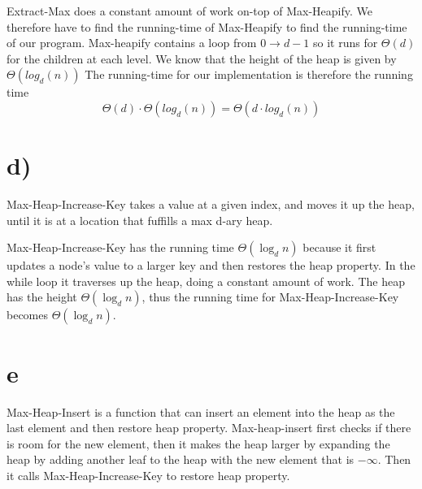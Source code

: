 \documentclass{article}
\begin{document}
Extract-Max does a constant amount of work on-top of Max-Heapify.
We therefore have to find the running-time of Max-Heapify to find the running-time of our program.
Max-heapify contains a loop from $0 \rightarrow d-1$ so it runs for $\Theta(d)$ for the children at each level.
We know that the height of the heap is given by $\Theta{(log_d{(n)})}$
The running-time for our implementation is therefore the running time
$$\Theta(d) \cdot \Theta{(log_d{(n)})} = \Theta{(d\cdot log_d{(n)})}$$


\section*{d)}
Max-Heap-Increase-Key takes a value at a given index, and moves it up the heap, until it is at a location that fuffills a max d-ary heap.

\begin{center}
	\begin{minipage}{12cm}
		\begin{algorithmic}
			\EndIf{}

			\EndWhile{}

			\EndProcedure{}
		\end{algorithmic}
	\end{minipage}
\end{center}

Max-Heap-Increase-Key has the running time $\Theta(\log_d{n})$ because it first updates a node's value to a larger key and then restores the heap property.
In the while loop it traverses up the heap, doing a constant amount of work.
The heap has the height $\Theta{(\log_d{n})}$, thus the running time for Max-Heap-Increase-Key becomes $\Theta(\log_d{n})$.



\section*{e}
Max-Heap-Insert is a function that can insert an element into the heap as the last element and then restore heap property. Max-heap-insert first checks if there is room for the new element, then it makes the heap larger by expanding the heap by adding another leaf to the heap with the new element that is $-\infty$. Then it calls Max-Heap-Increase-Key to restore heap property.
\end{document}
